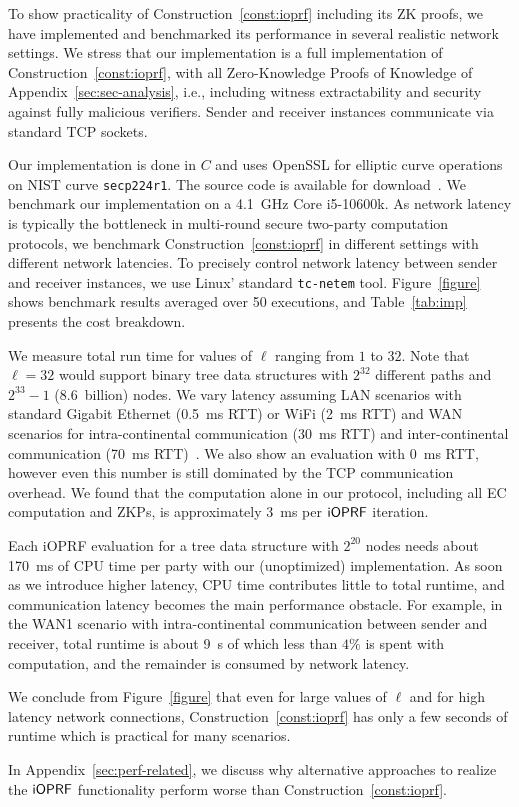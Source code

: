 To show practicality of Construction~\ref{const:ioprf} including its
ZK proofs, we have implemented and benchmarked its performance in
several realistic network settings. We stress that our implementation
is a full implementation of Construction~\ref{const:ioprf}, with all
Zero-Knowledge Proofs of Knowledge of Appendix~\ref{sec:sec-analysis},
i.e., including witness extractability and security against fully
malicious verifiers. Sender and receiver instances communicate via
standard TCP sockets.

Our implementation is done in $C$ and uses OpenSSL for elliptic curve
operations on NIST curve {\texttt{secp224r1}}. The source code is
available for download~\cite{srcode}.  We benchmark our implementation
on a 4.1~GHz Core i5-10600k.  As network latency is typically the
bottleneck in multi-round secure two-party computation protocols, we
benchmark Construction~\ref{const:ioprf} in different settings with
different network latencies.  To precisely control network latency
between sender and receiver instances, we use Linux' standard
{\texttt{tc-netem}} tool. Figure~\ref{figure} shows benchmark results
averaged over 50 executions, and Table~\ref{tab:imp} presents the cost
breakdown.

We measure total run time for values of $\ell$ ranging from $1$ to
$32$. Note that $\ell=32$ would support binary tree data structures
with $2^{32}$ different paths and $2^{33}-1$
(8.6~billion) nodes. We vary latency assuming LAN scenarios
with standard Gigabit Ethernet (0.5~ms RTT) or WiFi (2~ms RTT) and WAN
scenarios for intra-continental communication (30~ms RTT) and
inter-continental communication (70~ms RTT)~\cite{verizon}. We also
show an evaluation with 0~ms RTT, however even this number is still
dominated by the TCP communication overhead.  We found that the
computation alone in our protocol, including all EC computation and
ZKPs, is approximately 3~ms per $\mathsf{i}\mathsf{OPRF}$ iteration.

Each iOPRF evaluation for a tree data structure with $2^{20}$ nodes
needs about 170~ms of CPU time per party with our (unoptimized)
implementation.  As soon as we introduce higher latency, CPU time
contributes little to total runtime, and communication latency
becomes the main performance obstacle. For example, in the WAN1
scenario with intra-continental communication between sender and
receiver, total runtime is about 9~s of which less than $4\%$ is spent
with computation, and the remainder is consumed by network
latency.

We conclude from Figure~\ref{figure} that even for large values of
$\ell$ and for high latency network connections,
Construction~\ref{const:ioprf} has only a few seconds of runtime which
is practical for many scenarios.

In Appendix~\ref{sec:perf-related}, we discuss why alternative
approaches to realize the $\mathsf{i}\mathsf{OPRF}$ functionality perform worse than Construction~\ref{const:ioprf}.
